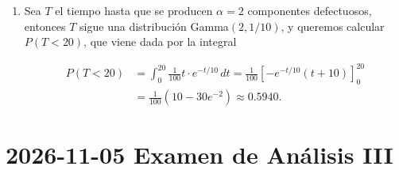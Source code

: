 \documentclass[
  spanish,
  a4paper,
]{scrreport}
\theoremstyle{definition}
\theoremstyle{remark}
\begin{document}
\begin{tcolorbox}
\begin{enumerate}
  \begin{align*}
  Var(X) &= E(X^2) - E(X)^{2} \\
  &= \int_0^{\infty} x^2 f(x)\, dx 
  - \left(\frac{\alpha}{\lambda}\right)^{2} \\
  &= \int_0^{\infty} x^2 \frac{\lambda^{\alpha}}{\Gamma(\alpha)}x^{\alpha - 1}e^{-\lambda x}\, dx
  \tag{Cambio $u = \lambda x$} \\
  &= \frac{\lambda^{\alpha}}{\Gamma(\alpha)} \int_0^{\infty} \left(\frac{u}{\lambda}\right)^{\alpha + 1} e^{-u} \frac{du}{\lambda} \\
  &= \frac{\lambda^{\alpha}}{\Gamma(\alpha)} \cdot \frac{1}{\lambda^{\alpha + 2}} \int_0^{\infty} u^{\alpha + 1} e^{-u} du \\
  &= \frac{\Gamma(\alpha + 2)}{\lambda^2 \Gamma(\alpha)} - \left(\frac{\alpha}{\lambda}\right)^{2} \\
  &= \frac{(\alpha + 1)\alpha \Gamma(\alpha)}{\lambda^2 \Gamma(\alpha)} - \frac{\alpha^2}{\lambda^2} 
  = \frac{\alpha}{\lambda^2}.
  \end{align*}
\item
  Sea \(T\) el tiempo hasta que se producen \(\alpha=2\) componentes
  defectuosos, entonces \(T\) sigue una distribución Gamma\((2, 1/10)\),
  y queremos calcular \(P(T < 20)\), que viene dada por la integral

  \begin{align*}
  P(T < 20) 
  &= \int_0^{20} \frac{1}{100} t\cdot e^{-t/10}\, dt 
  = \frac{1}{100}\left[-e^{-t/10}(t+10)\right]_0^{20} \\
  &= \frac{1}{100}\left(10 - 30e^{-2}\right) \approx 0.5940.
  \end{align*}
\end{enumerate}

\end{tcolorbox}


\chapter{\texorpdfstring{2026-11-05 Examen de Análisis
III}{2026-11-05  Examen de Análisis III}}\label{examen-de-anuxe1lisis-iii-6}
\end{document}
